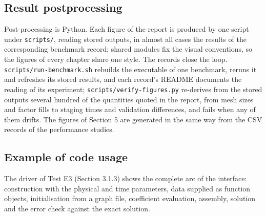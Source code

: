 \documentclass[11pt,a4paper]{article}
\begin{document}
\subsection{Result postprocessing}

Post-processing is Python. Each figure of the report is produced by one
script under \texttt{scripts/}, reading stored outputs, in almost all cases
the results of the corresponding benchmark record; shared modules fix the
visual conventions, so the figures of every chapter share one style. The
records close the loop. \texttt{scripts/run-benchmark.sh} rebuilds the
executable of one benchmark, reruns it and refreshes its stored results,
and each record's README documents the reading of its experiment;
\texttt{scripts/verify-figures.py} re-derives from the stored outputs
several hundred of the quantities quoted in the report, from mesh sizes and
factor fills to staging times and validation differences, and fails when
any of them drifts. The figures of Section 5 are generated in the same way from
the CSV records of the performance studies.

\subsection{Example of code usage}

The driver of Test E3 (Section 3.1.3) shows the complete arc of the
interface: construction with the physical and time parameters, data
supplied as function objects, initialisation from a graph file, coefficient
evaluation, assembly, solution and the error check against the exact
solution.
\end{document}

